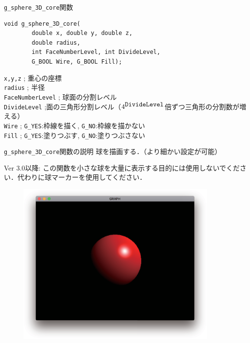 \documentclass[platex,a4paper,12pt]{jsarticle}%
\begin{document}
\begin{itembox}[l]{\texttt{g\_sphere\_3D\_core}関数}
\begin{verbatim}
void g_sphere_3D_core(
        double x, double y, double z,
        double radius,
        int FaceNumberLevel, int DivideLevel, 
        G_BOOL Wire, G_BOOL Fill);   
\end{verbatim}
\verb|x,y,z| ; 重心の座標\\
\verb|radius| ; 半径\\
\verb|FaceNumberLevel| ; 球面の分割レベル\\
\verb|DivideLevel| ;面の三角形分割レベル（$4^{\verb|DivideLevel|}$倍ずつ三角形の分割数が増える）\\
\verb|Wire| ; \verb|G_YES|:枠線を描く, \verb|G_NO|:枠線を描かない \\
\verb|Fill| ; \verb|G_YES|:塗りつぶす, \verb|G_NO|:塗りつぶさない
\end{itembox}

\begin{itembox}[l]{\texttt{g\_sphere\_3D\_core}関数の説明}
球を描画する．（より細かい設定が可能）

Ver 3.0以降: この関数を小さな球を大量に表示する目的には使用しないでください．代わりに球マーカーを使用してください．
\end{itembox}

\begin{figure}[htb]
\centering
\includegraphics[width=100mm]{./Figures/eps/Canvas_g_sphere_SDL.eps}
\end{figure}
\end{document}
